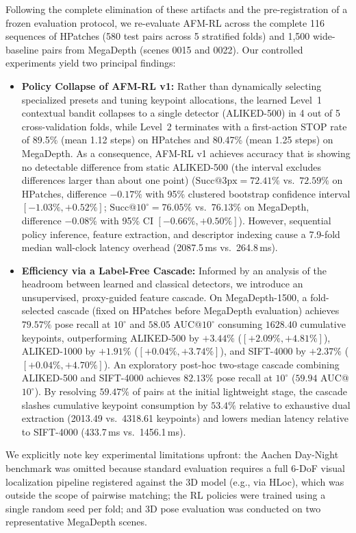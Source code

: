 \documentclass[conference]{IEEEtran}
\begin{document}
Following the complete elimination of these artifacts and the pre-registration of a frozen evaluation protocol, we re-evaluate AFM-RL across the complete 116 sequences of HPatches (580 test pairs across 5 stratified folds) and 1,500 wide-baseline pairs from MegaDepth (scenes 0015 and 0022). Our controlled experiments yield two principal findings:
\begin{itemize}
    \item \textbf{Policy Collapse of AFM-RL v1:} Rather than dynamically selecting specialized presets and tuning keypoint allocations, the learned Level~1 contextual bandit collapses to a single detector (ALIKED-500) in 4 out of 5 cross-validation folds, while Level~2 terminates with a first-action STOP rate of 89.5\% (mean 1.12 steps) on HPatches and 80.47\% (mean 1.25 steps) on MegaDepth. As a consequence, AFM-RL v1 achieves accuracy that is showing no detectable difference from static ALIKED-500 (the interval excludes differences larger than about one point) ($\text{Succ}@3\text{px} = 72.41\%$ vs.\ $72.59\%$ on HPatches, difference $-0.17\%$ with 95\% clustered bootstrap confidence interval $[-1.03\%, +0.52\%]$; $\text{Succ}@10^\circ = 76.05\%$ vs.\ $76.13\%$ on MegaDepth, difference $-0.08\%$ with 95\% CI $[-0.66\%, +0.50\%]$). However, sequential policy inference, feature extraction, and descriptor indexing cause a 7.9-fold median wall-clock latency overhead (2087.5\,ms vs.\ 264.8\,ms).
    \item \textbf{Efficiency via a Label-Free Cascade:} Informed by an analysis of the headroom between learned and classical detectors, we introduce an unsupervised, proxy-guided feature cascade. On MegaDepth-1500, a fold-selected cascade (fixed on HPatches before MegaDepth evaluation) achieves $79.57\%$ pose recall at $10^\circ$ and $58.05$ AUC@$10^\circ$ consuming $1628.40$ cumulative keypoints, outperforming ALIKED-500 by $+3.44\%$ ($[+2.09\%, +4.81\%]$), ALIKED-1000 by $+1.91\%$ ($[+0.04\%, +3.74\%]$), and SIFT-4000 by $+2.37\%$ ($[+0.04\%, +4.70\%]$). An exploratory post-hoc two-stage cascade combining ALIKED-500 and SIFT-4000 achieves $82.13\%$ pose recall at $10^\circ$ ($59.94$ AUC@$10^\circ$). By resolving $59.47\%$ of pairs at the initial lightweight stage, the cascade slashes cumulative keypoint consumption by $53.4\%$ relative to exhaustive dual extraction (2013.49 vs.\ 4318.61 keypoints) and lowers median latency relative to SIFT-4000 (433.7\,ms vs.\ 1456.1\,ms).
\end{itemize}

We explicitly note key experimental limitations upfront: the Aachen Day-Night benchmark was omitted because standard evaluation requires a full 6-DoF visual localization pipeline registered against the 3D model (e.g., via HLoc), which was outside the scope of pairwise matching; the RL policies were trained using a single random seed per fold; and 3D pose evaluation was conducted on two representative MegaDepth scenes.
\end{document}
